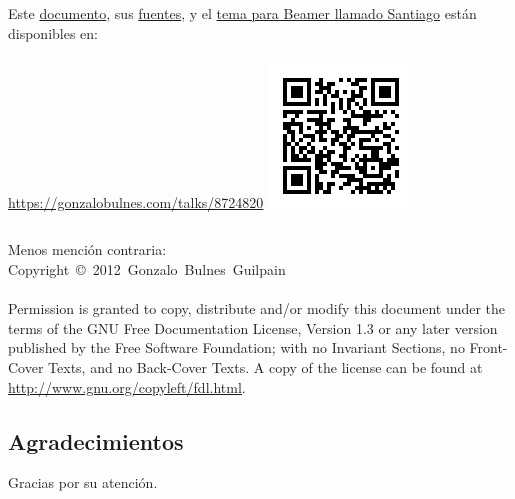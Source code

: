  \begin{frame}{\insertsubsection}

    \footnotesize
      \begin{columns}
          Este \href{https://gonzalobulnes.com/talks/8724820.pdf}{documento}, sus \href{https://gonzalobulnes.com/talks/8724820.tar.gz}{fuentes}, y el \href{https://gonzalobulnes.com/code/2347623.tar.gz}{tema para Beamer llamado Santiago} están disponibles en:\\~\\
          \url{https://gonzalobulnes.com/talks/8724820}    
        \hfill\includegraphics[width=\textwidth]{images/sources-talk.png}
      \end{columns}
    \normalsize

    \scriptsize{Menos mención contraria:}\\
    \noindent\scriptsize{Copyright~\copyright~2012~Gonzalo~Bulnes~Guilpain}\\~\\

    \scriptsize{Permission is granted to copy, distribute and/or modify this document
    under the terms of the GNU Free Documentation License, Version 1.3
    or any later version published by the Free Software Foundation;
    with no Invariant Sections, no Front-Cover Texts, and no Back-Cover Texts.
    A copy of the license can be found at \url{http://www.gnu.org/copyleft/fdl.html}.}
  \end{frame}

%
\subsection{Agradecimientos}

  \begin{frame}
    \vspace{0mm}
    \begin{center}
      Gracias por su atención.     
    \end{center}
  \end{frame}
